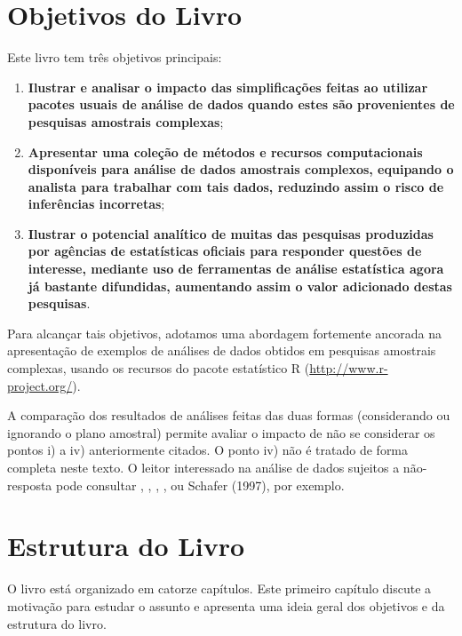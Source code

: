 \documentclass[]{book}
\theoremstyle{definition}
\theoremstyle{definition}
\theoremstyle{definition}
\theoremstyle{remark}
\begin{document}
\section{Objetivos do Livro}\label{objetivos-do-livro}

Este livro tem três objetivos principais:

\begin{enumerate}
\def\labelenumi{\arabic{enumi})}
\item
  \textbf{Ilustrar e analisar o impacto das simplificações feitas ao
  utilizar pacotes usuais de análise de dados quando estes são
  provenientes de pesquisas amostrais complexas};
\item
  \textbf{Apresentar uma coleção de métodos e recursos computacionais
  disponíveis para análise de dados amostrais complexos, equipando o
  analista para trabalhar com tais dados, reduzindo assim o risco de
  inferências incorretas};
\item
  \textbf{Ilustrar o potencial analítico de muitas das pesquisas
  produzidas por agências de estatísticas oficiais para responder
  questões de interesse, mediante uso de ferramentas de análise
  estatística agora já bastante difundidas, aumentando assim o valor
  adicionado destas pesquisas}.
\end{enumerate}

Para alcançar tais objetivos, adotamos uma abordagem fortemente ancorada
na apresentação de exemplos de análises de dados obtidos em pesquisas
amostrais complexas, usando os recursos do pacote estatístico R
(\url{http://www.r-project.org/}).

A comparação dos resultados de análises feitas das duas formas
(considerando ou ignorando o plano amostral) permite avaliar o impacto
de não se considerar os pontos i) a iv) anteriormente citados. O ponto
iv) não é tratado de forma completa neste texto. O leitor interessado na
análise de dados sujeitos a não-resposta pode consultar
\citep{kalton83a}, \citep{LR2002}, \citep{Rubin87}, \citep{SSW92}, ou
Schafer (1997), por exemplo.

\section{Estrutura do Livro}\label{estrutura-do-livro}

O livro está organizado em catorze capítulos. Este primeiro capítulo
discute a motivação para estudar o assunto e apresenta uma ideia geral
dos objetivos e da estrutura do livro.
\end{document}
